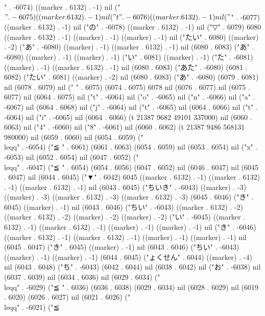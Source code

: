 " . -6074) ((marker . 6132) . -1) nil ("$" . -6075) ((marker . 6132) . -1) nil ("t" . -6076) ((marker . 6132) . -1) nil ("$" . -6077) ((marker . 6132) . -1) nil ("の" . -6078) ((marker . 6132) . -1) nil ("▽" . 6079) 6080 ((marker . 6132) . -1) ((marker) . -1) ((marker) . -1) nil ("たい" . 6080) ((marker) . -2) ("あ" . -6080) ((marker) . -1) ((marker . 6132) . -1) nil (6080 . 6083) ("あ" . -6080) ((marker) . -1) ((marker) . -1) ("い" . 6081) ((marker) . -1) ("た" . -6081) ((marker) . -1) ((marker . 6132) . -1) nil (6080 . 6083) ("あた" . -6080) (6081 . 6082) ("たい" . 6081) ((marker) . -2) nil (6080 . 6083) ("あ" . -6080) (6079 . 6081) nil (6078 . 6079) nil (" " . 6075) (6074 . 6075) 6078 nil (6076 . 6077) nil (6075 . 6077) nil (6064 . 6075) nil ("t" . -6064) nil ("o" . -6065) nil ("n" . -6066) nil ("a" . -6067) nil (6064 . 6068) nil ("j" . -6064) nil ("t" . -6065) nil (6064 . 6066) nil ("t" . -6064) nil ("i" . -6065) nil (6064 . 6066) (t 21387 9682 49101 337000) nil (6060 . 6063) nil ("4" . -6060) nil ("8" . -6061) nil (6060 . 6062) (t 21387 9486 568131 980000) nil (6059 . 6060) nil (6054 . 6059) ("\\leqq" . -6054) ("≦
" . 6061) (6061 . 6063) (6054 . 6059) nil (6053 . 6054) nil ("x" . -6053) nil (6052 . 6054) nil (6047 . 6052) ("\\leqq" . -6047) ("≦
" . 6054) (6054 . 6056) (6047 . 6052) nil (6046 . 6047) nil (6045 . 6047) nil (6044 . 6045) ("▼" . 6042) 6045 ((marker . 6132) . -1) ((marker . 6132) . -1) ((marker . 6132) . -1) nil (6043 . 6045) ("ちいき" . -6043) ((marker) . -3) ((marker) . -3) ((marker . 6132) . -3) ((marker . 6132) . -3) (6045 . 6046) ("き" . 6045) ((marker) . -1) nil (6043 . 6046) ("ちい" . -6043) ((marker . 6132) . -2) ((marker . 6132) . -2) ((marker) . -2) ((marker) . -2) ("い" . -6045) ((marker . 6132) . -1) ((marker . 6132) . -1) ((marker) . -1) ((marker) . -1) nil ("き" . -6046) ((marker . 6132) . -1) ((marker . 6132) . -1) ((marker) . -1) ((marker) . -1) nil (6045 . 6047) ("き" . 6045) ((marker) . -1) nil (6043 . 6046) ("ちい" . -6043) ((marker) . -1) ((marker) . -1) (6044 . 6045) ("ょくせん" . 6044) ((marker) . -4) nil (6043 . 6048) ("ち" . -6043) (6042 . 6044) nil (6038 . 6042) nil ("お" . -6038) nil (6037 . 6039) nil (6034 . 6036) nil (6029 . 6034) ("\\leqq" . -6029) ("≦
" . 6036) (6036 . 6038) (6029 . 6034) nil (6028 . 6029) nil (6019 . 6020) (6026 . 6027) nil (6021 . 6026) ("\\leqq" . -6021) ("≦
